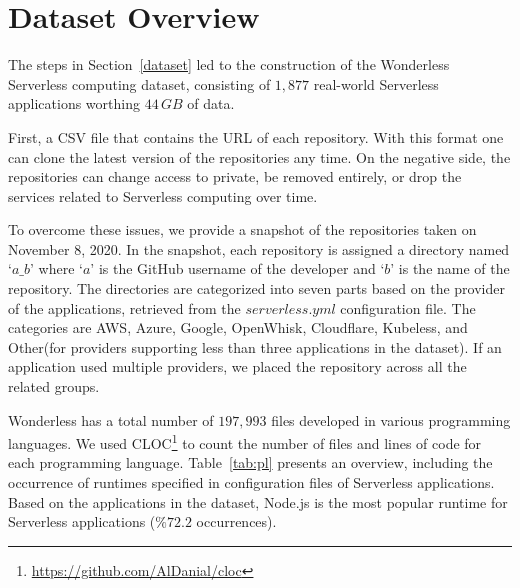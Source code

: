 
\section{Dataset Overview}
\label{schema}

The steps in Section~\ref{dataset} led to the construction of the 
Wonderless Serverless computing dataset, consisting of $1,877$
real-world Serverless applications worthing $44 \, GB$ of data. 

First, a CSV file that contains the URL of each repository. 
With this format one can clone the latest version of the repositories any time. 
On the negative side, the repositories can change access to private, 
be removed entirely, or drop the services related to Serverless computing 
over time. 

To overcome these issues, we provide a snapshot of the 
repositories taken on November 8, 2020. 
In the snapshot, each repository is assigned a directory named `$a\_b$' 
where `$a$' is the GitHub username of the developer and `$b$' is the name of the repository. 
The directories are categorized into seven parts based on the provider of the applications, 
retrieved from the $serverless.yml$ configuration file. 
The categories are AWS, Azure, Google, OpenWhisk, Cloudflare, Kubeless, 
and Other(for providers supporting less than three applications in the dataset).
If an application used multiple providers, we placed the repository across 
all the related groups. 

Wonderless has a total number of $197,993$ files developed in various programming languages. 
We used CLOC\footnote{\url{https://github.com/AlDanial/cloc}} to count the number of files and 
lines of code for each programming language. Table~\ref{tab:pl} presents an overview, 
including the occurrence of runtimes specified in configuration files of Serverless applications. 
Based on the applications in the dataset, Node.js is the most popular runtime 
for Serverless applications ($\%72.2$ occurrences).

